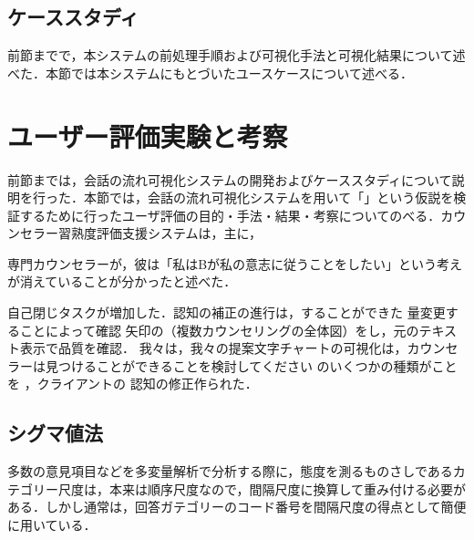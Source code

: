 \documentclass[shuuron]{kuee}
\begin{document}







\subsection{ケーススタディ}

前節までで，本システムの前処理手順および可視化手法と可視化結果について述べた．本節では本システムにもとづいたユースケースについて述べる．

\section{ユーザー評価実験と考察}

前節までは，会話の流れ可視化システムの開発およびケーススタディについて説明を行った．本節では，会話の流れ可視化システムを用いて「」という仮説を検証するために行ったユーザ評価の目的・手法・結果・考察についてのべる．カウンセラー習熟度評価支援システムは，主に，





  専門カウンセラーが，彼は「私はBが私の意志に従うことをしたい」という考えが消えていることが分かったと述べた．

自己閉じタスクが増加した．認知の補正の進行は，することができた 量変更することによって確認 矢印の（複数カウンセリングの全体図）をし，元のテキスト表示で品質を確認． 我々は，我々の提案文字チャートの可視化は，カウンセラーは見つけることができることを検討してください のいくつかの種類がことを ，クライアントの 認知の修正作られた．

\subsection{シグマ値法}
多数の意見項目などを多変量解析で分析する際に，態度を測るものさしであるカテゴリー尺度は，本来は順序尺度なので，間隔尺度に換算して重み付ける必要がある．しかし通常は，回答ガテゴリーのコード番号を間隔尺度の得点として簡便に用いている．
\end{document}
